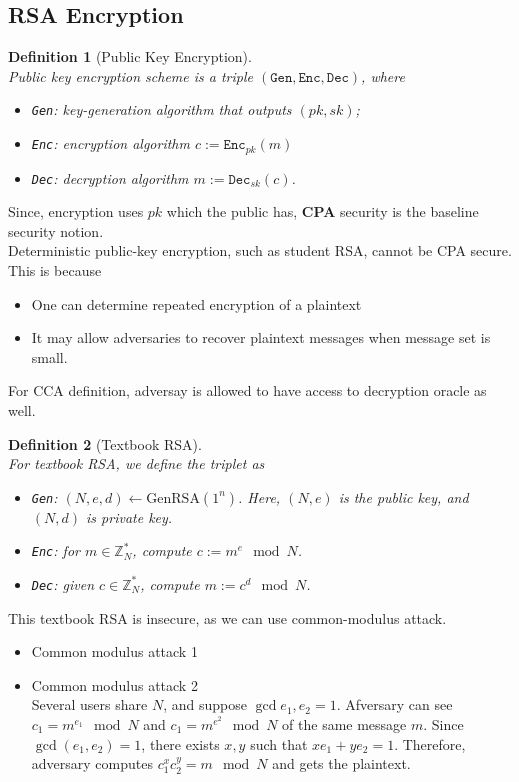 \documentclass[12pt]{article}
\newtheorem{definition}{Definition}[section]
\theoremstyle{definition}
\begin{document}
\subsection{RSA Encryption}
\begin{definition} [Public Key Encryption]
\hfill\\\normalfont Public key encryption scheme is a triple $(\texttt{Gen}, \texttt{Enc}, \texttt{Dec})$, where
\begin{itemize}
  \item \texttt{Gen}: key-generation algorithm that outputs $(pk, sk)$;
  \item \texttt{Enc}: encryption algorithm $c:=\texttt{Enc}_{pk}(m)$
  \item \texttt{Dec}: decryption algorithm $m:=\texttt{Dec}_{sk}(c)$.
\end{itemize}
\end{definition}
Since, encryption uses $pk$ which the public has, \textbf{CPA} security is the baseline security notion.\\
Deterministic public-key encryption, such as student RSA, cannot be CPA secure. This is because
\begin{itemize}
  \item One can determine repeated encryption of a plaintext
  \item It may allow adversaries to recover plaintext messages when message set is small.
\end{itemize}
For CCA definition, adversay is allowed to have access to decryption oracle as well.
\begin{definition}[Textbook RSA]
\hfill\\\normalfont For textbook RSA, we define the triplet as 
\begin{itemize}
  \item \texttt{Gen}: $(N,e,d)\leftarrow \text{GenRSA}(1^n)$. Here, $(N,e)$ is the public key, and $(N,d)$ is private key.
  \item \texttt{Enc}: for $m\in \mathbb{Z}_N^\ast$, compute $c:=m^e\mod N$.
  \item \texttt{Dec}: given $c\in\mathbb{Z}_N^\ast$, compute $m:=c^d\mod N$.
\end{itemize}
\end{definition}
This textbook RSA is insecure, as we can use common-modulus attack.
\begin{itemize}
  \item Common modulus attack 1
  \item Common modulus attack 2\\
  Several users share $N$, and suppose $\gcd{e_1,e_2}=1$. Afversary can see $c_1=m^{e_1}\mod N$ and $c_1=m^{e^2}\mod N$ of the same message $m$. Since $\gcd(e_1,e_2)=1$, there exists $x,y$ such that $xe_1+ye_2=1$. Therefore, adversary computes $c_1^xc_2^y=m\mod N$ and gets the plaintext.
\end{itemize}
\end{document}
